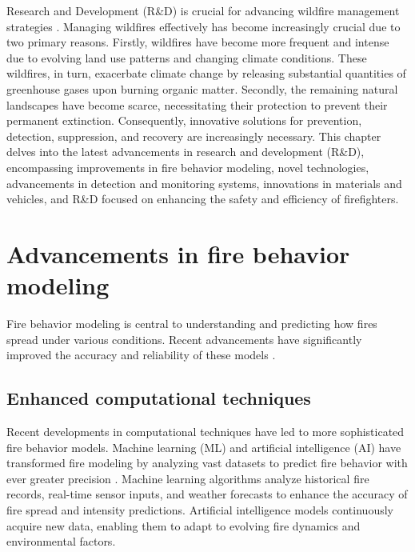 \documentclass[
  12 pt,
]{Nemilov}
\begin{document}
Research and Development (R\&D) is crucial for advancing wildfire management strategies \citep{jazebi2019review}. Managing wildfires effectively has become increasingly crucial due to two primary reasons. Firstly, wildfires have become more frequent and intense due to evolving land use patterns and changing climate conditions. These wildfires, in turn, exacerbate climate change by releasing substantial quantities of greenhouse gases upon burning organic matter. Secondly, the remaining natural landscapes have become scarce, necessitating their protection to prevent their permanent extinction. Consequently, innovative solutions for prevention, detection, suppression, and recovery are increasingly necessary. This chapter delves into the latest advancements in research and development (R\&D), encompassing improvements in fire behavior modeling, novel technologies, advancements in detection and monitoring systems, innovations in materials and vehicles, and R\&D focused on enhancing the safety and efficiency of firefighters.

\section{Advancements in fire behavior modeling}\label{advancements-in-fire-behavior-modeling}

Fire behavior modeling is central to understanding and predicting how fires spread under various conditions. Recent advancements have significantly improved the accuracy and reliability of these models \citep{hyde2012research, silva2022systematic}.

\subsection{Enhanced computational techniques}\label{enhanced-computational-techniques}

Recent developments in computational techniques have led to more sophisticated fire behavior models. Machine learning (ML) and artificial intelligence (AI) have transformed fire modeling by analyzing vast datasets to predict fire behavior with ever greater precision \citep{bot2022systematic, jain2020review}. Machine learning algorithms analyze historical fire records, real-time sensor inputs, and weather forecasts to enhance the accuracy of fire spread and intensity predictions. Artificial intelligence models continuously acquire new data, enabling them to adapt to evolving fire dynamics and environmental factors.
\end{document}
